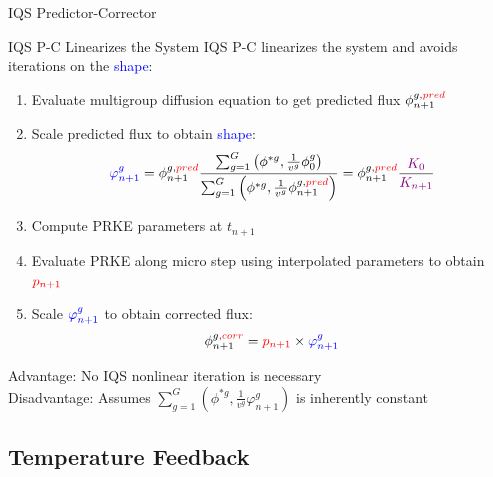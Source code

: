 \documentclass[8pt,xcolor=dvipnames]{beamer}
\newcommand{\ben}{\begin{enumerate}}
\newcommand{\een}{\end{enumerate}}
\newcommand{\tcr}[1]{\textcolor{red}{#1}}
\newcommand{\tcb}[1]{\textcolor{blue}{#1}}
\newcommand{\tcp}[1]{\textcolor{violet}{#1}}
\begin{document}
\begin{frame}{IQS Predictor-Corrector}

\begin{block}{IQS P-C Linearizes the System}
IQS P-C linearizes the system and avoids iterations on the \tcb{shape}: 
\ben
\item Evaluate multigroup diffusion equation to get predicted flux $\phi_{n+1}^{g,\tcr{pred}}$
\item Scale predicted flux to obtain \tcb{shape}:
\[
\tcb{\varphi^{g}_{n+1}} = \phi_{n+1}^{g,\tcr{pred}} \frac{\sum_{g=1}^G\left(\phi^{*g},\frac{1}{v^g}\phi ^g_{0}\right)}{\sum_{g=1}^G \left(\phi^{*g},\frac{1}{v^g}\phi_{n+1}^{g,\tcr{pred}}\right)} = \phi_{n+1}^{g,\tcr{pred}} \frac{\tcp{K_0}}{\tcp{K_{n+1}}}
\]
\item Compute PRKE parameters at $t_{n+1}$
\item Evaluate PRKE along micro step using interpolated parameters to obtain $\tcr{p_{n+1}}$
\item Scale $\tcb{\varphi^{g}_{n+1}}$ to obtain corrected flux:
\[
\phi_{n+1}^{g,\tcr{corr}} = \tcr{p_{n+1}} \times \tcb{\varphi^{g}_{n+1}}
\]
\een

 Advantage: No IQS nonlinear iteration is necessary \\
 Disadvantage: Assumes $\sum_{g=1}^G\left(\phi^{*g},\frac{1}{v^g}\varphi^g_{n+1}\right)$ is inherently constant \\
\end{block}

\end{frame}

\subsection{Temperature Feedback}
\end{document}
